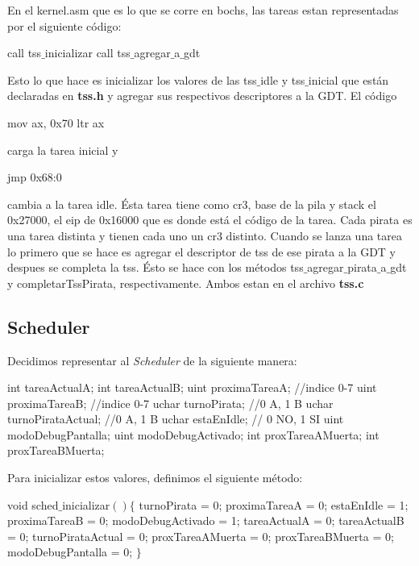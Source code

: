 En el kernel.asm que es lo que se corre en bochs, las tareas estan representadas por el siguiente código:
\begin{algorithmic}
\State call tss$\_$inicializar
\State call tss$\_$agregar$\_$a$\_$gdt
\end{algorithmic}
Esto lo que hace es inicializar los valores de las tss$\_$idle y tss$\_$inicial que están declaradas en \textbf{tss.h} y agregar sus respectivos descriptores a la GDT.
El código
\begin{algorithmic}
\State mov ax, 0x70
\State ltr ax
\end{algorithmic}
carga la tarea inicial y
\begin{algorithmic}
\State jmp 0x68:0
\end{algorithmic}
cambia a la tarea idle.
Ésta tarea tiene como cr3, base de la pila y stack el 0x27000, el eip de 0x16000 que es donde está el código de la tarea.
\newline
\newline
Cada pirata es una tarea distinta y tienen cada uno un cr3 distinto.
Cuando se lanza una tarea lo primero que se hace es agregar el descriptor de tss de ese pirata a la GDT y despues se completa la tss. Ésto se hace con los métodos tss$\_$agregar$\_$pirata$\_$a$\_$gdt y completarTssPirata, respectivamente. Ambos estan en el archivo \textbf{tss.c}
\subsection{Scheduler}

Decidimos representar al \textit{Scheduler} de la siguiente manera:
\begin{algorithmic}
\State \tab int tareaActualA;
\State \tab int tareaActualB;
\State \tab uint proximaTareaA; //indice 0-7
\State \tab uint proximaTareaB; //indice 0-7
\State \tab uchar turnoPirata; //0 A, 1 B
\State \tab uchar turnoPirataActual; //0 A, 1 B
\State \tab uchar estaEnIdle; // 0 NO, 1 SI
\State \tab uint modoDebugPantalla;
\State \tab uint modoDebugActivado;
\State \tab int proxTareaAMuerta;
\State \tab int proxTareaBMuerta;
\end{algorithmic}

Para inicializar estos valores, definimos el siguiente m\'etodo:
\begin{algorithmic}
    \State \tab void sched$\_$inicializar$() \{$
    \State \tab turnoPirata = 0;
    \State \tab proximaTareaA = 0;
    \State \tab estaEnIdle = 1;
    \State \tab proximaTareaB = 0;
    \State \tab modoDebugActivado = 1;
    \State \tab tareaActualA = 0;
    \State \tab tareaActualB = 0;
    \State \tab turnoPirataActual = 0;
    \State \tab proxTareaAMuerta = 0;
    \State \tab proxTareaBMuerta = 0;
    \State \tab modoDebugPantalla = 0; 
    \State \tab $\}$
\end{algorithmic}

